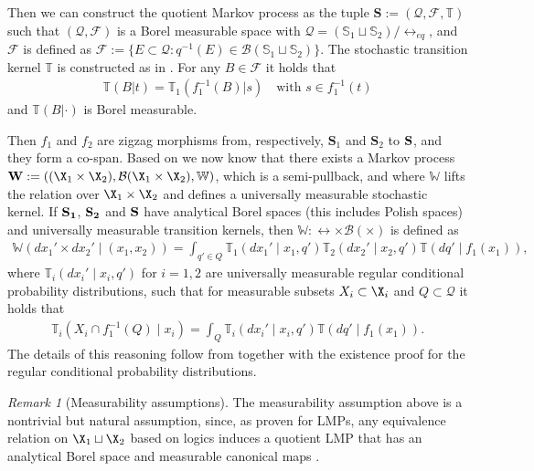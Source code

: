 \documentclass[letterpaper, 10 pt, conference]{amsart}
\theoremstyle{definition}
\theoremstyle{example}
\theoremstyle{remark}
\newtheorem{remark}{Remark}
\begin{document}
Then we can construct the quotient Markov process as the tuple $\mathbf S:=(\mathcal Q,\mathcal F, \mathbb T)$ such that  $(\mathcal Q,\mathcal F)$ is a Borel measurable space with
  $\mathcal Q=(\mathbb S_1\sqcup\mathbb S_2)/\rel_{eq}$, and $\mathcal{F}$ is defined as
 $\mathcal{F}:=\{E\subset\mathcal Q : q^{-1}(E)\in\mathcal B(\mathbb S_1\sqcup\mathbb S_2)\}$.  
The stochastic transition kernel $\mathbb T$ is
 constructed as in \cite[Proof of Proposition 9.4]{Desharnais2002}. For any $B\in \mathcal F$ it holds that 
 \begin{align}
\mathbb T (B|t)= \mathbb T_1 (f_1^{-1}(B)|s) \quad \mbox{with } s\in f_1^{-1}(t)
 \end{align}   and $\mathbb T(B|\cdot)$ is Borel measurable.
 
Then $f_1$ and $f_2$ are zigzag morphisms from,  respectively, $\mathbf S_1$ and $\mathbf S_2$ to $\bf S$, 
and they form a co-span. 
Based on \cite{Edalat1999a} we now know that there exists a Markov process $\mathbf W:=\left((\X_1\times \X_2),\mathcal{B}(\X_1\times \X_2),\mathbb W\right)$, 
which is a semi-pullback, 
and where $\mathbb W$ lifts the relation over $\X_1\times\X_2$ and defines a universally measurable stochastic kernel. 
If $\bf S_1$, $\bf S_2$ and $\bf S$ have analytical Borel spaces (this includes Polish spaces) and universally measurable transition kernels, then $\mathbb W:\rel\times \mathcal{B}(\times)$ is defined  as
\begin{align}
\mathbb W\left(dx_1'\times dx_2'\mid (x_1,x_2)\right)=\int_{q'\in Q} \mathbb T_1(dx_1'\mid x_1,q') \mathbb T_2(dx_2'\mid x_2,q')  \mathbb T(dq'\mid f_1(x_1)), 
\end{align}
where $\mathbb T_i(dx_i'\mid x_i,q') $ for $i=1,2$ are universally measurable regular conditional probability distributions, 
such that for measurable subsets $X_i\subset \X_i$ and $Q\subset \mathcal Q$ it holds that 
\begin{align*}
\mathbb T_i(X_i \cap f_{1}^{-1}(Q) \mid x_i)=\int_Q \mathbb T_i(dx_i'\mid x_i,q') \mathbb T (dq'\mid f_1(x_1)).\end{align*}
The details of this reasoning follow from \cite{Edalat1999a} together with the existence proof for the regular conditional probability distributions.  


\begin{remark}[Measurability assumptions]
The measurability assumption above is a nontrivial but natural assumption, since, as proven for LMPs, 
any equivalence relation on $ \X_1\sqcup \X_2$ based on logics induces a quotient LMP that has an analytical Borel space and measurable canonical maps \cite[Proposition 9.4]{Desharnais2002}.  
\end{remark}
\end{document}
